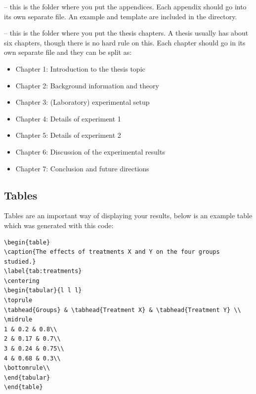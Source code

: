  -- this is the folder where you put the appendices. Each appendix should go into its own separate  file. An example and template are included in the directory.

 -- this is the folder where you put the thesis chapters. A thesis usually has about six chapters, though there is no hard rule on this. Each chapter should go in its own separate  file and they can be split as:
\begin{itemize}
\item Chapter 1: Introduction to the thesis topic
\item Chapter 2: Background information and theory
\item Chapter 3: (Laboratory) experimental setup
\item Chapter 4: Details of experiment 1
\item Chapter 5: Details of experiment 2
\item Chapter 6: Discussion of the experimental results
\item Chapter 7: Conclusion and future directions
\end{itemize}


\subsection{Tables}

Tables are an important way of displaying your results, below is an example table which was generated with this code:

{\small
\begin{verbatim}
\begin{table}
\caption{The effects of treatments X and Y on the four groups studied.}
\label{tab:treatments}
\centering
\begin{tabular}{l l l}
\toprule
\tabhead{Groups} & \tabhead{Treatment X} & \tabhead{Treatment Y} \\
\midrule
1 & 0.2 & 0.8\\
2 & 0.17 & 0.7\\
3 & 0.24 & 0.75\\
4 & 0.68 & 0.3\\
\bottomrule\\
\end{tabular}
\end{table}
\end{verbatim}
}

